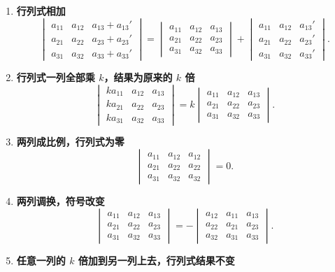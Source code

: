 \documentclass[UTF8,11pt]{ctexart}
\theoremstyle{cnthm}
\begin{document}
\begin{enumerate}
\item \textbf{行列式相加}
\[
\begin{vmatrix}
a_{11} & a_{12} & a_{13}+a_{13}'\\
a_{21} & a_{22} & a_{23}+a_{23}'\\
a_{31} & a_{32} & a_{33}+a_{33}'
\end{vmatrix}
=
\begin{vmatrix}
a_{11} & a_{12} & a_{13}\\
a_{21} & a_{22} & a_{23}\\
a_{31} & a_{32} & a_{33}
\end{vmatrix}
+
\begin{vmatrix}
a_{11} & a_{12} & a_{13}'\\
a_{21} & a_{22} & a_{23}'\\
a_{31} & a_{32} & a_{33}'
\end{vmatrix}.
\]
\item \textbf{行列式一列全部乘 $k$，结果为原来的 $k$ 倍}
\[
\begin{vmatrix}
ka_{11} & a_{12} & a_{13}\\
ka_{21} & a_{22} & a_{23}\\
ka_{31} & a_{32} & a_{33}
\end{vmatrix}
=k\begin{vmatrix}
a_{11} & a_{12} & a_{13}\\
a_{21} & a_{22} & a_{23}\\
a_{31} & a_{32} & a_{33}
\end{vmatrix}.
\]
\item \textbf{两列成比例，行列式为零}
\[
\begin{vmatrix}
a_{11} & a_{12} & a_{12}\\
a_{21} & a_{22} & a_{22}\\
a_{31} & a_{32} & a_{32}
\end{vmatrix}=0 .
\]
\item \textbf{两列调换，符号改变}
\[
\begin{vmatrix}
a_{11} & a_{12} & a_{13}\\
a_{21} & a_{22} & a_{23}\\
a_{31} & a_{32} & a_{33}
\end{vmatrix}
=-
\begin{vmatrix}
a_{12} & a_{11} & a_{13}\\
a_{22} & a_{21} & a_{23}\\
a_{32} & a_{31} & a_{33}
\end{vmatrix}.
\]
\item \textbf{任意一列的 $k$ 倍加到另一列上去，行列式结果不变}

\end{enumerate}
\end{document}

